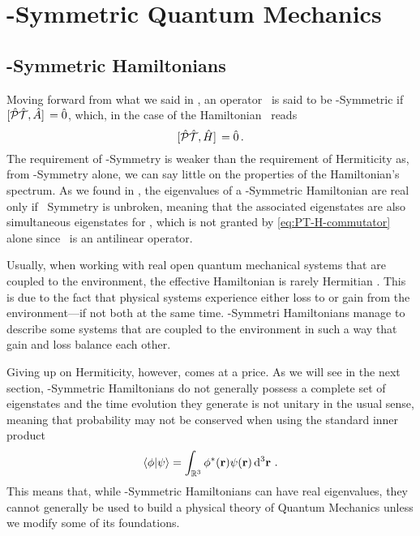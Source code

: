\chapter{\PT-Symmetric Quantum Mechanics}\label{ch:pt-symmetric-hamiltonians}
    \section{\PT-Symmetric Hamiltonians}
        Moving forward from what we said in , an operator \hA\ is said to be \PT-Symmetric if $\comm*{\hPT}{\hA} = \hzero$, which, in the case of the Hamiltonian \hH\ reads
        \begin{equation}
            \label{eq:PT-H-commutator}
            \comm*{\hPT}{\hH} = \hzero
            \myperiod
        \end{equation}
        The requirement of \PT-Symmetry is weaker than the requirement of Hermiticity as, from \PT-Symmetry alone, we can say little on the properties of the Hamiltonian's spectrum. As we found in , the eigenvalues of a \PT-Symmetric Hamiltonian are real only if \PT\ Symmetry is unbroken, meaning that the associated eigenstates are also simultaneous eigenstates for \hPT, which is not granted by \eqref{eq:PT-H-commutator} alone since \hPT\ is an antilinear operator.

        Usually, when working with real open quantum mechanical systems that are coupled to the environment, the effective Hamiltonian is rarely Hermitian \cite{bender2024}. This is due to the fact that physical systems experience either loss to or gain from the environment---if not both at the same time. \PT-Symmetri Hamiltonians manage to describe some systems that are coupled to the environment in such a way that gain and loss balance each other.

        Giving up on Hermiticity, however, comes at a price. As we will see in the next section, \PT-Symmetric Hamiltonians do not generally possess a complete set of eigenstates and the time evolution they generate is not unitary in the usual sense, meaning that probability may not be conserved when using the standard inner product
        \begin{equation}
            \label{eq:standard-inner-product}
            \braket{\phi}{\psi} = \int\nolimits_{\bbR^3} \phi^*\pqty{\vb{r}} \psi\pqty{\vb{r}} \dd[3]{\vb{r}}
            \myperiod
        \end{equation}
        This means that, while \PT-Symmetric Hamiltonians can have real eigenvalues, they cannot generally be used to build a physical theory of Quantum Mechanics unless we modify some of its foundations.


